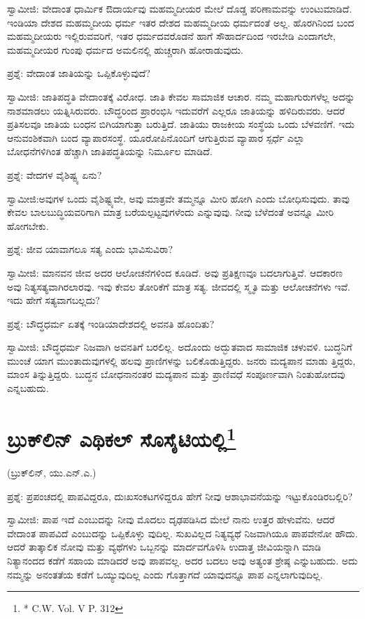 ಸ್ವಾಮೀಜಿ: ವೇದಾಂತ ಧಾರ್ಮಿಕ ಔದಾರ್ಯವು ಮಹಮ್ಮದೀಯರ ಮೇಲೆ ದೊಡ್ಡ ಪರಿಣಾಮವನ್ನು ಉಂಟುಮಾಡಿದೆ. ಇಂಡಿಯಾ ದೇಶದ ಮಹಮ್ಮದೀಯ ಧರ್ಮ ಇತರ ದೇಶದ ಮಹಮ್ಮದೀಯ ಧರ್ಮದಂತೆ ಅಲ್ಲ. ಹೊರಗಿನಿಂದ ಬಂದ ಮಹಮ್ಮದೀಯರು ಇಲ್ಲಿರುವವರಿಗೆ, ಇತರ ಧರ್ಮದವರೊಡನೆ ಹಾಗೆ ಸೌಹಾರ್ದದಿಂದ ಇರಬೇಡಿ ಎಂದಾಗಲೇ, ಮಹಮ್ಮದೀಯರ ಗುಂಪು ಧರ್ಮದ ಅಮಲಿನಲ್ಲಿ ಹುಚ್ಚರಾಗಿ ಹೋರಾಡುವುದು.

ಪ್ರಶ್ನೆ: ವೇದಾಂತ ಜಾತಿಯನ್ನು ಒಪ್ಪಿಕೊಳ್ಳುವುದೆ?

ಸ್ವಾಮೀಜಿ: ಜಾತಿಪದ್ಧತಿ ವೇದಾಂತಕ್ಕೆ ವಿರೋಧ. ಜಾತಿ ಕೇವಲ ಸಾಮಾಜಿಕ ಆಚಾರ. ನಮ್ಮ ಮಹಾಗುರುಗಳೆಲ್ಲ ಅದನ್ನು ನಾಶಮಾಡಲು ಯತ್ನಿಸಿರುವರು. ಬೌದ್ಧರಿಂದ ಪ್ರಾರಂಭಿಸಿ ಇದುವರೆಗೆ ಎಲ್ಲರೂ ಜಾತಿಯನ್ನು ಹಳಿದಿರುವರು. ಆದರೆ ಪ್ರತಿಸಲವೂ ಜಾತಿಯ ಬಂಧನ ಬಿಗಿಯಾಗುತ್ತಾ ಬರುತ್ತಿದೆ. ಜಾತಿಯು ರಾಜಕೀಯ ಸಂಸ್ಥೆಯ ಒಂದು ಬೆಳವಣಿಗೆ. ಇದು ಆನುವಂಶಿಕವಾಗಿ ಬಂದ ವ್ಯಾಪಾರಸಂಸ್ಥೆ. ಯೂರೋಪಿನೊಂದಿಗೆ ಆಗುತ್ತಿರುವ ವ್ಯಾಪಾರ ಸ್ಪರ್ಧೆ ಎಲ್ಲಾ ಬೋಧನೆಗಳಿಗಿಂತ ಹೆಚ್ಚಾಗಿ ಜಾತಿಪದ್ಧತಿಯನ್ನು ನಿರ್ಮೂಲ ಮಾಡಿದೆ.

ಪ್ರಶ್ನೆ: ವೇದಗಳ ವೈಶಿಷ್ಟ್ಯ ಏನು?

ಸ್ವಾಮೀಜಿ:ಅವುಗಳ ಒಂದು ವೈಶಿಷ್ಟ್ಯವೇ, ಅವು ಮಾತ್ರವೇ ತಮ್ಮನ್ನೂ ಮೀರಿ ಹೋಗಿ ಎಂದು ಬೋಧಿಸುವುದು. ತಾವು ಕೇವಲ ಬಾಲಬುದ್ಧಿಯವರಿಗಾಗಿ ಮಾತ್ರ ಬರೆಯಲ್ಪಟ್ಟವುಗಳೆಂದು ಎನ್ನುವುವು. ನೀವು ಬೆಳೆದಂತೆ ಅವನ್ನೂ ಮೀರಿ ಹೋಗಬೇಕು.

ಪ್ರಶ್ನೆ: ಜೀವ ಯಾವಾಗಲೂ ಸತ್ಯ ಎಂದು ಭಾವಿಸುವಿರಾ?

ಸ್ವಾಮೀಜಿ: ಮಾನವನ ಜೀವ ಅದರ ಆಲೋಚನೆಗಳಿಂದ ಕೂಡಿದೆ. ಅವು ಪ್ರತಿಕ್ಷಣವೂ ಬದಲಾಗುತ್ತಿವೆ. ಆದಕಾರಣ ಅವು ನಿತ್ಯಸತ್ಯವಾಗಿರಲಾರವು. ಇವು ಕೇವಲ ತೋರಿಕೆಗೆ ಮಾತ್ರ ಸತ್ಯ. ಜೀವದಲ್ಲಿ ಸ್ಮೃತಿ ಮತ್ತು ಆಲೋಚನೆಗಳು ಇವೆ. ಇದು ಹೇಗೆ ಸತ್ಯವಾಗಬಲ್ಲದು?

ಪ್ರಶ್ನೆ: ಬೌದ್ಧಧರ್ಮ ಏತಕ್ಕೆ ಇಂಡಿಯಾದೇಶದಲ್ಲಿ ಅವನತಿ ಹೊಂದಿತು?

ಸ್ವಾಮೀಜಿ: ಬೌದ್ಧಧರ್ಮ ನಿಜವಾಗಿ ಅವನತಿಗೆ ಬರಲಿಲ್ಲ. ಅದೊಂದು ಅದ್ಭುತವಾದ ಸಾಮಾಜಿಕ ಚಳುವಳಿ. ಬುದ್ಧನಿಗೆ ಮುಂಚೆ ಯಾಗ ಮುಂತಾದುವುಗಳಲ್ಲಿ ಹಲವು ಪ್ರಾಣಿಗಳನ್ನು ಬಲಿಕೊಡುತ್ತಿದ್ದರು. ಜನರು ಮದ್ಯಪಾನ ಮಾಡು ತ್ತಿದ್ದರು, ಮಾಂಸ ತಿನ್ನುತ್ತಿದ್ದರು. ಬುದ್ಧನ ಬೋಧನಾನಂತರ ಮದ್ಯಪಾನ ಮತ್ತು ಪ್ರಾಣಿವಧೆ ಸಂಪೂರ್ಣವಾಗಿ ನಿಂತುಹೋದವು ಎನ್ನಬಹುದು.


\section[ಬ್ರುಕ್‍ಲಿನ್ ಎಥಿಕಲ್ ಸೊಸೈಟಿಯಲ್ಲಿ]{ಬ್ರುಕ್‍ಲಿನ್ ಎಥಿಕಲ್ ಸೊಸೈಟಿಯಲ್ಲಿ\protect\footnote{* C.W. Vol. V P. 312}}

\begin{center}
(ಬ್ರುಕ್​ಲಿನ್​, ಯು.ಎನ್​.ಎ.)
\end{center}

ಪ್ರಶ್ನೆ: ಪ್ರಪಂಚದಲ್ಲಿ ಪಾಪವಿದ್ದರೂ, ದುಃಖಸಂಕಟಗಳಿದ್ದರೂ ಹೇಗೆ ನೀವು ಆಶಾಭಾವನೆಯನ್ನು ಇಟ್ಟುಕೊಂಡಿರಬಲ್ಲಿರಿ?

ಸ್ವಾಮೀಜಿ: ಪಾಪ ಇದೆ ಎಂಬುದನ್ನು ನೀವು ಮೊದಲು ದೃಢಪಡಿಸಿದ ಮೇಲೆ ನಾನು ಉತ್ತರ ಹೇಳುವೆನು. ಆದರೆ ವೇದಾಂತ ಪಾಪವಿದೆ ಎಂಬುದನ್ನು ಒಪ್ಪಿಕೊಳ್ಳು ವುದಿಲ್ಲ. ಸುಖವಿಲ್ಲದ ನಿತ್ಯವ್ಯಥೆ ನಿಜವಾಗಿಯೂ ಪಾಪವೇನೋ ಹೌದು. ಆದರೆ ತಾತ್ಕಾಲಿಕ ನೋವು ಮತ್ತು ವ್ಯಥೆಗಳು ಒಬ್ಬನನ್ನು ಮಾರ್ದವಗೊಳಿಸಿ ಉದಾತ್ತ ಜೀವಿಯನ್ನಾಗಿ ಮಾಡಿ ನಿತ್ಯಾನಂದದ ಕಡೆಗೆ ಸಹಾಯ ಮಾಡಿದರೆ ಅವು ಪಾಪವಲ್ಲ. ಅದರ ಬದಲು ಅವು ಅತ್ಯಂತ ಶ್ರೇಷ್ಠ ಎನ್ನುಬಹುದು. ಅದು ನಮ್ಮನ್ನು ಅನಂತತೆಯ ಕಡೆಗೆ ಒಯ್ಯುವುದಿಲ್ಲ ಎಂದು ಗೊತ್ತಾಗದೆ ಯಾವುದನ್ನೂ ಪಾಪ ಎನ್ನಲಾಗುವುದಿಲ್ಲ.

